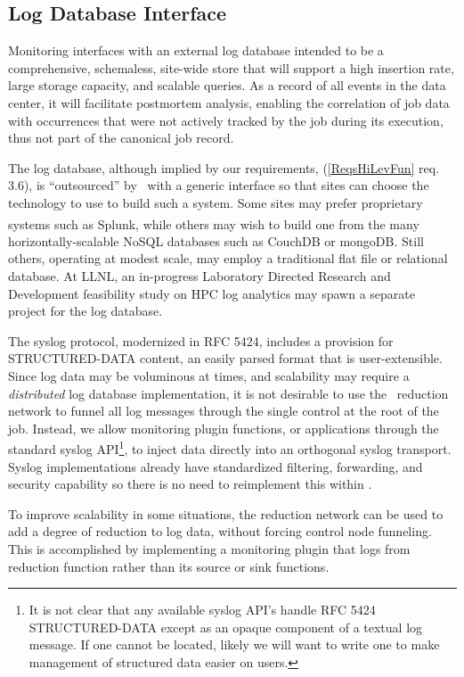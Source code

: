 \subsection{Log Database Interface}

Monitoring interfaces with an external log database intended to
be a comprehensive, schemaless, site-wide store that will support a
high insertion rate, large storage capacity, and scalable queries.
As a record of all events in the data center, it will facilitate
postmortem analysis, enabling the correlation of job data
with occurrences that were not actively tracked by the job during its
execution, thus not part of the canonical job record.

The log database, although implied by our requirements, 
(\ref{ReqsHiLevFun} req. 3.6), is ``outsourced'' by \ngrm\ with
a generic interface so that sites can choose the technology
to use to build such a system.  Some sites may prefer proprietary
systems such as Splunk\textsuperscript{\textregistered}, while others may
wish to build one from the many horizontally-scalable NoSQL databases
such as CouchDB\cite{CouchDB} or mongoDB\cite{MongoDB}.
Still others, operating at modest scale, may employ a traditional flat
file or relational database.  At LLNL, an in-progress Laboratory
Directed Research and Development feasibility study on HPC log
analytics\cite{LogLDRD} may spawn a separate project for the log database.

The syslog protocol, modernized in RFC 5424\cite{rfc5424},
includes a provision for STRUCTURED-DATA content,
an easily parsed format that is user-extensible.
Since log data may be voluminous at times, and scalability may require
a {\em distributed} log database implementation, it is not desirable to
use the \ngrm\ reduction network to funnel all log messages through the
single control at the root of the job.  Instead, we allow monitoring
plugin functions, or applications through the standard syslog
API\footnote{It is not clear that any available syslog API's handle
RFC 5424 STRUCTURED-DATA except as an opaque component of a textual
log message.  If one cannot be located, likely we will want to write
one to make management of structured data easier on users.},
to inject data directly into an orthogonal syslog transport.
Syslog implementations already have standardized filtering, forwarding,
and security capability so there is no need to reimplement this within \ngrm.

To improve scalability in some situations, the reduction network can be used
to add a degree of reduction to log data, without forcing control node
funneling.  This is accomplished by implementing a monitoring plugin
that logs from reduction function rather than its source or sink functions.

